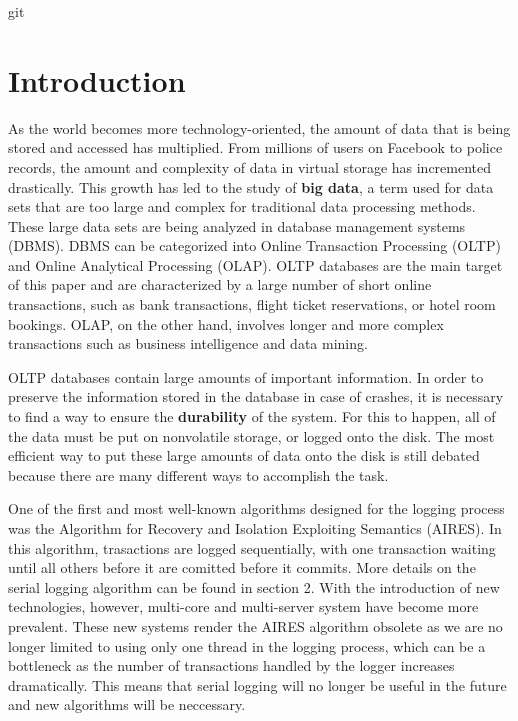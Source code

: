 git \section{Introduction}

As the world becomes more technology-oriented, the amount of data that is being stored and accessed has multiplied. From millions of users on Facebook to police records, the amount and complexity of data in virtual storage has incremented drastically. This growth has led to the study of \textbf{big data}, a term used for data sets that are too large and complex for traditional data processing methods. These large data sets are being analyzed in database management systems (DBMS). DBMS can be categorized into Online Transaction Processing (OLTP) and Online Analytical Processing (OLAP). OLTP databases are the main target of this paper and are characterized by a large number of short online transactions, such as bank transactions, flight ticket reservations, or hotel room bookings. OLAP, on the other hand, involves longer and more complex transactions such as business intelligence and data mining. \par

OLTP databases contain large amounts of important information. In order to preserve the information stored in the database in case of crashes, it is necessary to find a way to ensure the \textbf{durability} of the system. For this to happen, all of the data must be put on nonvolatile storage, or logged onto the disk. The most efficient way to put these large amounts of data onto the disk is still debated because there are many different ways to accomplish the task. \par

One of the first and most well-known algorithms designed for the logging process was the Algorithm for Recovery and Isolation Exploiting Semantics (AIRES). In this algorithm, trasactions are logged sequentially, with one transaction waiting until all others before it are comitted before it commits. More details on the serial logging algorithm can be found in section 2. With the introduction of new technologies, however, multi-core and multi-server system have become more prevalent. These new systems render the AIRES algorithm obsolete as we are no longer limited to using only one thread in the logging process, which can be a bottleneck as the number of transactions handled by the logger increases dramatically. This means that serial logging will no longer be useful in the future and new algorithms will be neccessary.  \par

